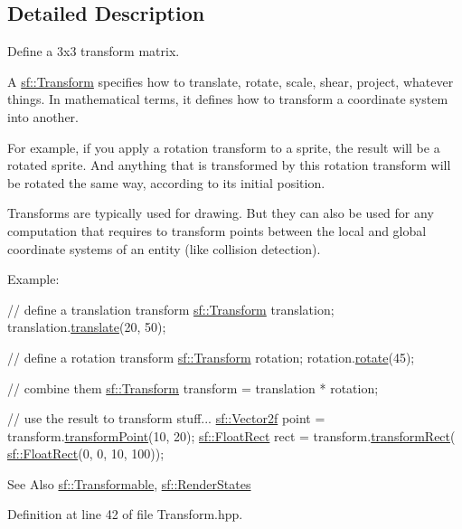 \subsection{Detailed Description}
Define a 3x3 transform matrix. 

A \hyperlink{classsf_1_1Transform}{sf\-::\-Transform} specifies how to translate, rotate, scale, shear, project, whatever things. In mathematical terms, it defines how to transform a coordinate system into another.

For example, if you apply a rotation transform to a sprite, the result will be a rotated sprite. And anything that is transformed by this rotation transform will be rotated the same way, according to its initial position.

Transforms are typically used for drawing. But they can also be used for any computation that requires to transform points between the local and global coordinate systems of an entity (like collision detection).

Example\-: 
\begin{DoxyCode}
\textcolor{comment}{// define a translation transform}
\hyperlink{classsf_1_1Transform}{sf::Transform} translation;
translation.\hyperlink{classsf_1_1Transform_ab54f6c8070cc05e2afcb3145fbf4395a}{translate}(20, 50);

\textcolor{comment}{// define a rotation transform}
\hyperlink{classsf_1_1Transform}{sf::Transform} rotation;
rotation.\hyperlink{classsf_1_1Transform_a3e548c3c9e3fb9d4bd43cf852669e555}{rotate}(45);

\textcolor{comment}{// combine them}
\hyperlink{classsf_1_1Transform}{sf::Transform} transform = translation * rotation;

\textcolor{comment}{// use the result to transform stuff...}
\hyperlink{classsf_1_1Vector2}{sf::Vector2f} point = transform.\hyperlink{classsf_1_1Transform_af20913c6a27087c26192c116397ab40a}{transformPoint}(10, 20);
\hyperlink{classsf_1_1Rect}{sf::FloatRect} rect = transform.\hyperlink{classsf_1_1Transform_a345112559981d988e92b54b7976fca8a}{transformRect}(
      \hyperlink{classsf_1_1Rect}{sf::FloatRect}(0, 0, 10, 100));
\end{DoxyCode}


\begin{DoxySeeAlso}{See Also}
\hyperlink{classsf_1_1Transformable}{sf\-::\-Transformable}, \hyperlink{classsf_1_1RenderStates}{sf\-::\-Render\-States} 
\end{DoxySeeAlso}


Definition at line 42 of file Transform.\-hpp.



